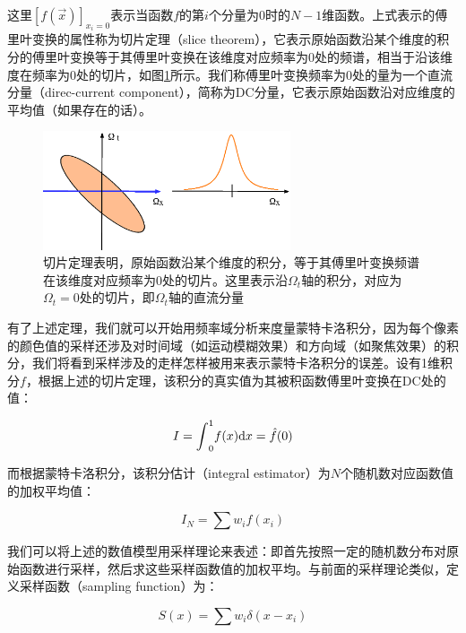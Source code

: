 \noindent 这里$[f(\vec{x})]_{x_i=0}$表示当函数$f$的第$i$个分量为0时的$N-1$维函数。上式表示的傅里叶变换的属性称为切片定理（slice theorem），它表示原始函数沿某个维度的积分的傅里叶变换等于其傅里叶变换在该维度对应频率为0处的频谱，相当于沿该维度在频率为0处的切片，如图\ref{f:pt-slice}所示。我们称傅里叶变换频率为0处的量为一个直流分量（direc-current component），简称为DC分量，它表示原始函数沿对应维度的平均值（如果存在的话）。

\begin{figure}
	\sidecaption
	\includegraphics[width=0.65\textwidth]{figures/pt/slice-theorem}
	\caption{切片定理表明，原始函数沿某个维度的积分，等于其傅里叶变换频谱在该维度对应频率为0处的切片。这里表示沿$\Omega_t$轴的积分，对应为$\Omega_t=0$处的切片，即$\Omega_t$轴的直流分量}
	\label{f:pt-slice}
\end{figure}

有了上述定理，我们就可以开始用频率域分析来度量蒙特卡洛积分，因为每个像素的颜色值的采样还涉及对时间域（如运动模糊效果）和方向域（如聚焦效果）的积分，我们将看到采样涉及的走样怎样被用来表示蒙特卡洛积分的误差。设有1维积分$f$，根据上述的切片定理，该积分的真实值为其被积函数傅里叶变换在DC处的值：

\begin{equation}
	I={\rm \int}^{1}_0 f(x){\rm d}x=\hat{f}(0)
\end{equation}

\noindent 而根据蒙特卡洛积分，该积分估计（integral estimator）为$N$个随机数对应函数值的加权平均值：

\begin{equation}\label{eq:pt-setimator-sum}
	I_N=\sum w_i f(x_i)
\end{equation}

\noindent 我们可以将上述的数值模型用采样理论来表述：即首先按照一定的随机数分布对原始函数进行采样，然后求这些采样函数值的加权平均。与前面的采样理论类似，定义采样函数（sampling function）为：

\begin{equation}
	S(x)=\sum w_i\delta(x-x_i)
\end{equation}

